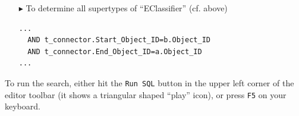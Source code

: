 \begin{itemize}
\item[$\blacktriangleright$] To determine all supertypes of ``EClassifier'' (cf. above)
\begin{lstlisting}[frame=single,framerule=0pt]
...
  AND t_connector.Start_Object_ID=b.Object_ID
  AND t_connector.End_Object_ID=a.Object_ID
...
\end{lstlisting}

\end{itemize}

To run the search, either hit the \texttt{Run SQL} button in the upper left corner of the editor toolbar (it shows a triangular shaped ``play'' icon), or
press \texttt{F5} on your keyboard.

\clearpage

